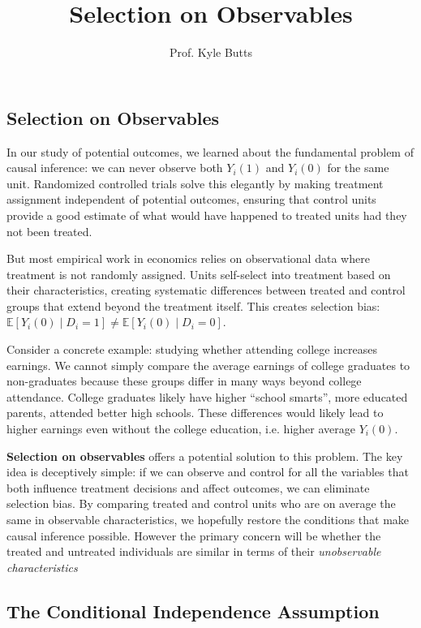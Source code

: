 \documentclass[12pt]{article}
\title{Selection on Observables}
\author{Prof. Kyle Butts}
\date{}
\begin{document}
\maketitle
\begin{multicols}{2}

\section*{Selection on Observables}

In our study of potential outcomes, we learned about the fundamental problem of causal inference: we can never observe both $Y_i(1)$ and $Y_i(0)$ for the same unit.
Randomized controlled trials solve this elegantly by making treatment assignment independent of potential outcomes, ensuring that control units provide a good estimate of what would have happened to treated units had they not been treated.

But most empirical work in economics relies on observational data where treatment is not randomly assigned.
Units self-select into treatment based on their characteristics, creating systematic differences between treated and control groups that extend beyond the treatment itself.
This creates selection bias: $\mathbb{E}[Y_i(0) \mid D_i = 1] \neq \mathbb{E}[Y_i(0) \mid D_i = 0]$.

Consider a concrete example: studying whether attending college increases earnings.
We cannot simply compare the average earnings of college graduates to non-graduates because these groups differ in many ways beyond college attendance.
College graduates likely have higher ``school smarts'', more educated parents, attended better high schools. 
These differences would likely lead to higher earnings even without the college education, i.e. higher average $Y_i(0)$.

\textbf{Selection on observables} offers a potential solution to this problem.
The key idea is deceptively simple: if we can observe and control for all the variables that both influence treatment decisions and affect outcomes, we can eliminate selection bias.
By comparing treated and control units who are on average the same in observable characteristics, we hopefully restore the conditions that make causal inference possible.
However the primary concern will be whether the treated and untreated individuals are similar in terms of their \emph{unobservable characteristics}

\subsection*{The Conditional Independence Assumption}


\end{multicols}
\end{document}
